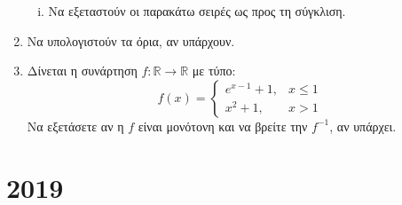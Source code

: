 \documentclass[a4paper,table]{report}
\begin{document}
\begin{enumerate}
\begin{enumerate}[i)]
            \item Να εξεταστούν οι παρακάτω σειρές ως προς τη σύγκλιση.
        \end{enumerate}

    \item Να υπολογιστούν τα όρια, αν υπάρχουν.


    \item Δίνεται η συνάρτηση $ f \colon \mathbb{R} \to \mathbb{R} $ με τύπο:
        \[
            f(x) = 
            \begin{cases} 
                e^{x-1}+1, & x \leq 1 \\ 
                x^{2}+1, & x >1 
            \end{cases}  
        \] 
        Να εξετάσετε αν η $f$ είναι μονότονη και να βρείτε την $ f^{-1} $, αν 
        υπάρχει.
\end{enumerate}

\section*{2019}
\end{document}
